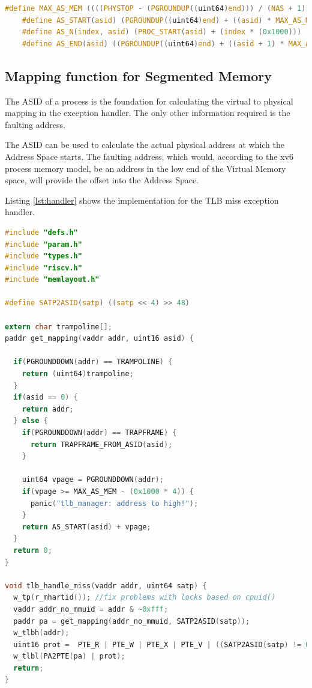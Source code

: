 \begin{lstlisting}[language=c,float=h!,
    label={lst:macros}]
    #define MAX_AS_MEM ((((PHYSTOP - (PGROUNDUP((uint64)end))) / (NAS + 1)) >> 12 )<< 12)
    #define AS_START(asid) (PGROUNDUP((uint64)end) + ((asid) * MAX_AS_MEM))
    #define AS_N(index, asid) (PROC_START(asid) + (index * (0x1000)))
    #define AS_END(asid) ((PGROUNDUP((uint64)end) + ((asid + 1) * MAX_AS_MEM))-0x1000)
\end{lstlisting}

\subsection{Mapping function for Segmented Memory}
The ASID of a process is the foundation for calculating the virtual to physical mapping in the exception handler.
The only other information required is the faulting address.

The ASID can be used to calculate the actual physical address at which the Address Space starts.
The faulting address, which would, according to the xv6 process memory model, be an address in the low
end of the Virtual Memory space, will provide the offset into the Address Space.

Listing \ref{lst:handler} shows the implementation for the TLB miss exception handler.

\begin{lstlisting}[language=c,float=h!,
    label={lst:handler}]
#include "defs.h"
#include "param.h"
#include "types.h"
#include "riscv.h"
#include "memlayout.h"

#define SATP2ASID(satp) ((satp << 4) >> 48)

extern char trampoline[];
paddr get_mapping(vaddr addr, uint16 asid) {

  if(PGROUNDDOWN(addr) == TRAMPOLINE) {
    return (uint64)trampoline;
  }
  if(asid == 0) {
    return addr;
  } else {
    if(PGROUNDDOWN(addr) == TRAPFRAME) {
      return TRAPFRAME_FROM_ASID(asid);
    }

    uint64 vpage = PGROUNDDOWN(addr);
    if(vpage >= MAX_AS_MEM - (0x1000 * 4)) {
      panic("tlb_manager: address to high!");
    }
    return AS_START(asid) + vpage;
  }
  return 0;
}

void tlb_handle_miss(vaddr addr, uint64 satp) {
  w_tp(r_mhartid()); //fix problems with locks based on cpuid()
  vaddr addr_no_mmuid = addr & ~0xfff;
  paddr pa = get_mapping(addr_no_mmuid, SATP2ASID(satp));
  w_tlbh(addr);
  uint16 prot =  PTE_R | PTE_W | PTE_X | PTE_V | ((SATP2ASID(satp) != 0) ? PTE_U : 0);
  w_tlbl(PA2PTE(pa) | prot);
  return;
}
\end{lstlisting}

